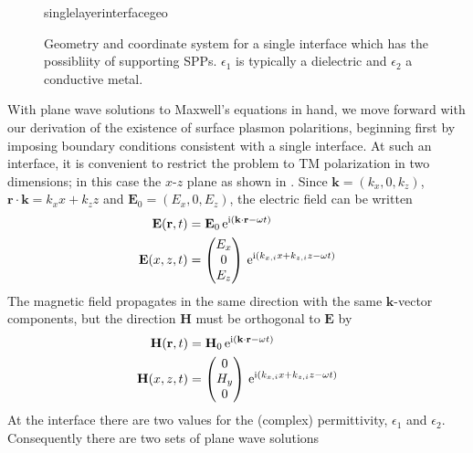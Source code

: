 \begin{figure}[ht]
 \centering
 {singlelayerinterfacegeo}
 \caption{Geometry and coordinate system for a single interface which has
									the possibliity of supporting SPPs.  $\epsilon_1$ is typically a dielectric and $\epsilon_2$ a conductive metal.}
 \label{fig:singleinterfacegeo}
\end{figure}
With plane wave solutions to Maxwell's equations in hand, we move forward
with our derivation of the existence of surface plasmon polaritions,
beginning first by imposing boundary
conditions consistent with a single interface.  At such an
interface, it is convenient to restrict the problem to TM polarization in
two dimensions;  in this case the $x$-$z$ plane as shown in
. Since $\mathbf{k}=(k_x,0,k_z)$,
$\mathbf{r}\cdot\mathbf{k}=k_x x + k_z z$ and $\mathbf{E}_0 = (E_x, 0,
E_z)$, the electric field can be written 
\begin{align}
\mathbf{E} ( \mathbf{r}, t ) &= \mathbf{E}_0\, {\mathrm{e}}^{{\mathrm{i}} (\mathbf{k}
\cdot \mathbf{r} - \omega t )}\\
\mathbf{E}(x,z,t)&=\begin{pmatrix}
E_x\\ 0\\ E_z
\end{pmatrix}
\, {\mathrm{e}}^{{\mathrm{i}}(k_{x,i}x+k_{z,i}z-\omega t)}
\label{eqn:planewavexz}
\end{align}
The magnetic field propagates in the same direction with the
same $\mathbf{k}$-vector components, but the direction
$\mathbf{H}$ must be orthogonal to $\mathbf{E}$ by
\begin{align}
\mathbf{H} ( \mathbf{r}, t ) &= \mathbf{H}_0\, {\mathrm{e}}^{{\mathrm{i}} (\mathbf{k}
\cdot \mathbf{r} - \omega t )}\\
\mathbf{H}(x,z,t)&=\begin{pmatrix}
0\\ H_y\\ 0
\end{pmatrix}
\, {\mathrm{e}}^{{\mathrm{i}}(k_{x,i}x+k_{z,i}z-\omega t)}
\end{align}
At the interface there are two values for the (complex) permittivity,
$\epsilon_1$ and $\epsilon_2$.  Consequently
there are two sets of plane wave solutions
